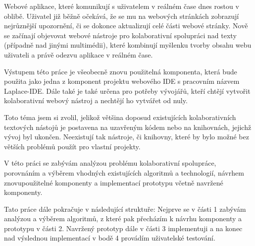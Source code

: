
Webové aplikace, které komunikují s uživatelem v reálném čase dnes rostou v oblibě.
Uživatel již běžně očekává, že se mu na webových stránkách zobrazují nejrůznější upozornění, či se dokonce aktualizují celé části webové stránky.
Nově se začínají objevovat webové nástroje pro kolaborativní spolupráci nad texty (případně nad jinými multimédii), které kombinují myšlenku tvorby obsahu webu uživateli a právě odezvu aplikace v reálném čase.

Výstupem této práce je všeobecně znovu použitelná komponenta, která bude použita jako jedna z komponent projektu webového IDE s pracovním názvem Laplace-IDE.
Dále také je také určena pro potřeby vývojářů, kteří chtějí vytvořit kolaborativní webový nástroj a nechtějí ho vytvářet od nuly.


Toto téma jsem si zvolil, jelikož většina doposud existujících kolaborativních textových nástojů je postavena na uzavřeným kódem nebo na knihovnách, jejichž vývoj byl ukončen.
Neexistují tak nástroje, či knihovny, které by bylo možné bez větších problémů použít pro vlastní projekty.

V této práci se zabývám analýzou problému kolaborativní spolupráce, porovnáním a výběrem vhodných existujících algoritmů a technologií, návrhem znovupoužitelné komponenty a implementací prototypu včetně navržené komponenty.

Tato práce dále pokračuje v následující struktuře:
Nejprve se v části 1 zabývám analýzou a výběrem algoritmů, z které pak přecházím k návrhu komponenty a prototypu v části 2.
Navržený prototyp dále v části 3 implementuji a na konec nad výslednou implementací v bodě 4 provádím uživatelské testování.

